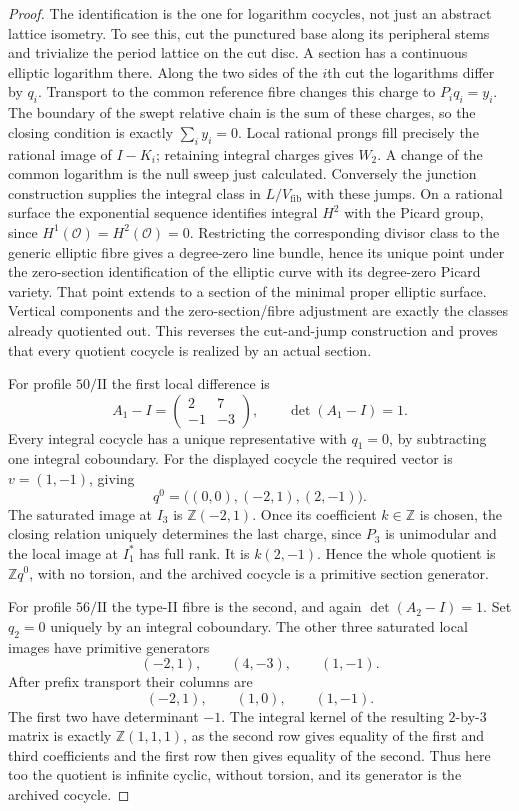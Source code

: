 \begin{proof}
The identification is the one for logarithm cocycles, not just
an abstract lattice isometry.  To see this, cut the punctured
base along its peripheral stems and trivialize the period
lattice on the cut disc.  A section has a continuous elliptic
logarithm there.  Along the two sides of the $i$th cut the
logarithms differ by $q_i$.  Transport to the common reference
fibre changes this charge to $P_iq_i=y_i$.  The boundary of
the swept relative chain is the sum of these charges, so the
closing condition is exactly $\sum_i y_i=0$.  Local rational
prongs fill precisely the rational image of $I-K_i$; retaining
integral charges gives $W_2$.  A change of the common logarithm
is the null sweep just calculated.  Conversely the junction
construction supplies the integral class in $L/V_{\mathrm{fib}}$
with these jumps.  On a rational surface the exponential
sequence identifies integral $H^2$ with the Picard group,
since $H^1(\mathcal O)=H^2(\mathcal O)=0$.  Restricting the
corresponding divisor class to the generic elliptic fibre
gives a degree-zero line bundle, hence its unique point under
the zero-section identification of the elliptic curve with
its degree-zero Picard variety.  That point extends to a
section of the minimal proper elliptic surface.  Vertical
components and the zero-section/fibre adjustment are exactly
the classes already quotiented out.  This reverses the
cut-and-jump construction and proves that every quotient
cocycle is realized by an actual section.

For profile $50/\mathrm{II}$ the first local difference is
\[
 A_1-I=\begin{pmatrix}2&7\\-1&-3\end{pmatrix},\qquad
 \det(A_1-I)=1.
\]
Every integral cocycle has a unique representative with
$q_1=0$, by subtracting one integral coboundary.  For the
displayed cocycle the required vector is $v=(1,-1)$, giving
\[
 q^0=\bigl((0,0),(-2,1),(2,-1)\bigr).
\]
The saturated image at $I_3$ is
$\mathbb Z(-2,1)$.  Once its coefficient $k\in\mathbb Z$
is chosen, the closing relation uniquely determines the
last charge, since $P_3$ is unimodular and the local image
at $I_1^*$ has full rank.  It is $k(2,-1)$.  Hence the
whole quotient is $\mathbb Zq^0$, with no torsion, and the
archived cocycle is a primitive section generator.

For profile $56/\mathrm{II}$ the type-II fibre is the second,
and again $\det(A_2-I)=1$.  Set $q_2=0$ uniquely by an
integral coboundary.  The other three saturated local images
have primitive generators
\[
 (-2,1),\qquad(4,-3),\qquad(1,-1).
\]
After prefix transport their columns are
\[
 (-2,1),\qquad(1,0),\qquad(1,-1).
\]
The first two have determinant $-1$.  The integral kernel
of the resulting $2$-by-$3$ matrix is exactly
$\mathbb Z(1,1,1)$, as the second row gives equality of the
first and third coefficients and the first row then gives
equality of the second.  Thus here too the quotient is
infinite cyclic, without torsion, and its generator is the
archived cocycle.


\end{proof}
